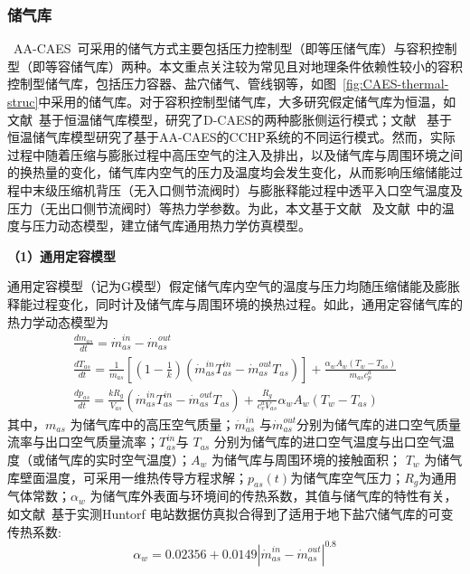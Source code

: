 \subsubsection{储气库}
\label{sec:Air-tank-thermo-model}
~AA-CAES~可采用的储气方式主要包括压力控制型（即等压储气库）\cite{Isobaric-ACAES-18,Thesis-Wangzhiwen}与容积控制型（即等容储气库）\cite{TICC-15,Thesis-JaiDuhan}两种。本文重点关注较为常见且对地理条件依赖性较小的容积控制型储气库，包括压力容器\cite{TICC-15}、盐穴储气\cite{CAES-Review-17-Rui-salt}、管线钢\cite{ST-CAES-CN-16-Rui}等，如图~\ref{fig:CAES-thermal-struc}中采用的储气库。对于容积控制型储气库，大多研究假定储气库为恒温，如文献~基于恒温储气库模型，研究了D-CAES的两种膨胀侧运行模式；文献~ 基于恒温储气库模型研究了基于AA-CAES的CCHP系统的不同运行模式。然而，实际过程中随着压缩与膨胀过程中高压空气的注入及排出，以及储气库与周围环境之间的换热量的变化，储气库内空气的压力及温度均会发生变化，从而影响压缩储能过程中末级压缩机背压（无入口侧节流阀时）与膨胀释能过程中透平入口空气温度及压力（无出口侧节流阀时）等热力学参数。为此，本文基于文献~ 及文献~中的温度与压力动态模型，建立储气库通用热力学仿真模型。

\textbf{（1）通用定容模型}

通用定容模型（记为G模型）假定储气库内空气的温度与压力均随压缩储能及膨胀释能过程变化，同时计及储气库与周围环境的换热过程。如此，通用定容储气库的热力学动态模型为\cite{Model-AA-CAES-10,Cavern-model-12,CAES-Wind-Rui-19}
\begin{subequations}
\label{equ:Air-tank-model-G}
\begin{gather}
   \frac{{d{m_{as}}}}{{dt}} = \dot m_{as}^{in} - \dot m_{as}^{out}\\
   \frac{{d{T_{as}}}}{{dt}} = \frac{1}{{{m_{as}}}}[ {({1 - \frac{1}{k}})({\dot m_{as}^{in}T_{as}^{in} - \dot m_{as}^{out}T_{as}^{}})} ] + \frac{{{\alpha _w}{A_w}({{T_w} - {T_{as}}})}}{{{m_{as}}c_p^a}}\label{equ:Air-tank-model-G-T}\\
   \frac{{d{p_{as}}}}{{dt}} = \frac{{k{R_g}}}{{{V_{as}}}}({\dot m_{as}^{in}T_{as}^{in} - \dot m_{as}^{out}T_{as}^{}}) + \frac{{{R_g}}}{{c_v^a{V_{as}}}}{\alpha _w}{A_w}({{T_w} - {T_{as}}} )\label{equ:Air-tank-model-G-P}
\end{gather}
\end{subequations}
其中，${m_{as}}$ 为储气库中的高压空气质量；$\dot m_{as}^{in}$ 与$\dot m_{as}^{out}$分别为储气库的进口空气质量流率与出口空气质量流率；$T_{as}^{in}$与 $T_{as}$ 分别为储气库的进口空气温度与出口空气温度（或储气库的实时空气温度）；${A_w}$ 为储气库与周围环境的接触面积； ${T_w}$ 为储气库壁面温度，可采用一维热传导方程求解；$p_{as}(t)$为储气库空气压力；$R_g$为通用气体常数；${\alpha _w}$ 为储气库外表面与环境间的传热系数，其值与储气库的特性有关，如文献~基于实测Huntorf 电站数据仿真拟合得到了适用于地下盐穴储气库的可变传热系数:
\begin{equation}
\label{equ:wall-thermal-coef}
{\alpha _w} = 0.02356 + 0.0149{\left| {\dot m_{as}^{in} - \dot m_{as}^{out}} \right|^{0.8}}
\end{equation}

